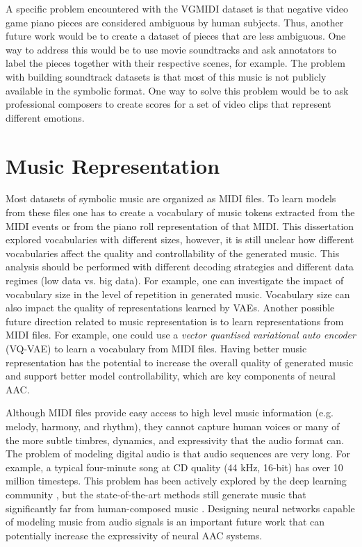A specific problem encountered with the VGMIDI dataset is that negative video game piano pieces are considered  ambiguous by human subjects. Thus, another future work would be to create a dataset of pieces that are less ambiguous. One way to address this would be to use movie soundtracks and ask annotators to label the pieces together with their respective scenes, for example. The problem with building soundtrack datasets is that most of this music is not publicly available in the symbolic format. One way to solve this problem would be to ask professional composers to create scores for a set of video clips that represent different emotions.

\section{Music Representation}

Most datasets of symbolic music are organized as MIDI files. To learn models from these files one has to create a vocabulary of music tokens extracted from the MIDI events or from the piano roll representation of that MIDI. This dissertation explored vocabularies with different sizes, however, it is still unclear how different vocabularies affect the quality and controllability of the generated music. This analysis should be performed with different decoding strategies and different data regimes (low data vs. big data). For example, one can investigate the impact of vocabulary size in the level of repetition in generated music. Vocabulary size can also impact the quality of representations learned by VAEs. Another possible future direction related to music representation is to learn representations from MIDI files. For example, one could use a \textit{vector quantised variational auto encoder} (VQ-VAE) to learn a vocabulary from MIDI files.  Having better music representation has the potential to increase the overall quality of generated music and support better model controllability, which are key components of neural AAC.

Although MIDI files provide easy access to high level music information (e.g. melody, harmony, and rhythm), they cannot capture human voices or many of the more subtle timbres, dynamics, and expressivity that the audio format can. The problem of modeling digital audio is that audio sequences are very long. For example, a typical four-minute song at CD quality (44 kHz, 16-bit) has over 10 million timesteps. This problem has been actively explored by the deep learning community \cite{oord2016wavenet, mehri2016samplernn, yamamoto2020parallel}, but the state-of-the-art methods still generate music that significantly far from human-composed music \cite{dhariwal2020jukebox}. Designing neural networks capable of modeling music from audio signals is an important future work that can potentially increase the expressivity of neural AAC systems.

